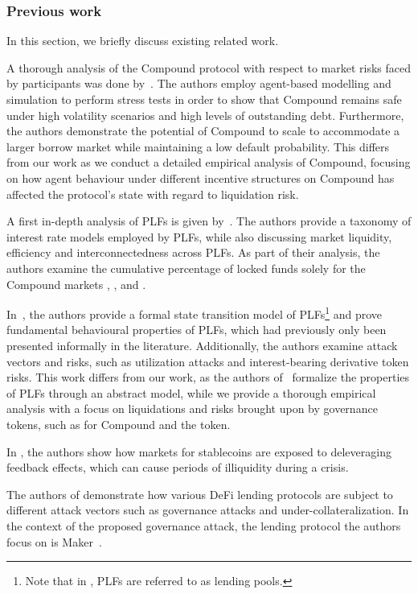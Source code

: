 \subsubsection{Previous work}
In this section, we briefly discuss existing related work.

A thorough analysis of the Compound protocol with respect to market risks faced by participants was done by~\cite{kao2020}.
The authors employ agent-based modelling and simulation to perform stress tests in order to show that Compound remains safe under high volatility scenarios and high levels of outstanding debt.
Furthermore, the authors demonstrate the potential of Compound to scale to accommodate a larger borrow market while maintaining a low default probability.
This differs from our work as we conduct a detailed empirical analysis of Compound, focusing on how agent behaviour under different incentive structures on Compound has affected the protocol's state with regard to liquidation risk.

A first in-depth analysis of PLFs is given by~\cite{10.1145/3419614.3423254}.
The authors provide a taxonomy of interest rate models employed by PLFs, while also discussing market liquidity, efficiency and interconnectedness across PLFs.
As part of their analysis, the authors examine the cumulative percentage of locked funds solely for the Compound markets , , and .

In~\cite{bartoletti2020sok}, the authors provide a formal state transition model of PLFs\footnote{Note that in \cite{bartoletti2020sok}, PLFs are referred to as lending pools.} and prove fundamental behavioural properties of PLFs, which had previously only been presented informally in the literature.
Additionally, the authors examine attack vectors and risks, such as utilization attacks and interest-bearing derivative token risks.
This work differs from our work, as the authors of~\cite{bartoletti2020sok} formalize the properties of PLFs through an abstract model, while we provide a thorough empirical analysis with a focus on liquidations and risks brought upon by governance tokens, such as for Compound and the  token.

In \cite{klages2019stability}, the authors show how markets for stablecoins are exposed to deleveraging feedback effects, which can cause periods of illiquidity during a crisis.

The authors of \cite{gudgeon2020decentralized} demonstrate how various DeFi lending protocols are subject to different attack vectors such as governance attacks and under-collateralization.
In the context of the proposed governance attack, the lending protocol the authors focus on is Maker~\cite{whitepaper:maker}.


